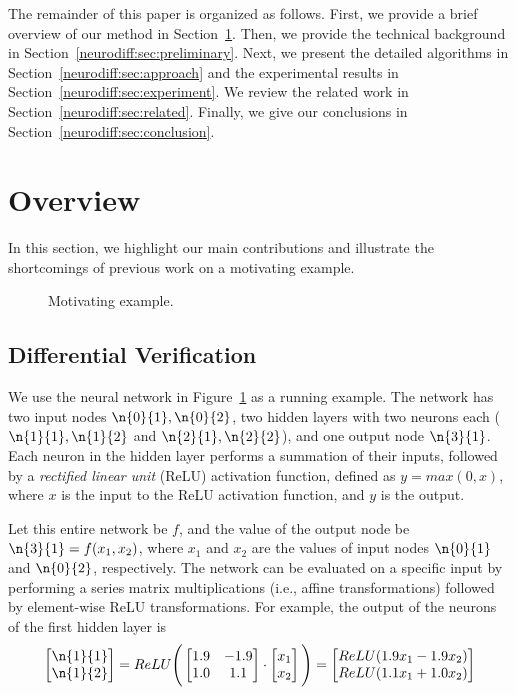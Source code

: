 The remainder of this paper is organized as follows.  First, we
provide a brief overview of our method in Section~\ref{neurodiff:sec:overview}.
Then, we provide the technical background in
Section~\ref{neurodiff:sec:preliminary}.  Next, we present the detailed
algorithms in Section~\ref{neurodiff:sec:approach} and the experimental results
in Section~\ref{neurodiff:sec:experiment}.  We review the related work in
Section~\ref{neurodiff:sec:related}. Finally, we give our conclusions in
Section~\ref{neurodiff:sec:conclusion}.



\section{Overview}
\label{neurodiff:sec:overview}

In this section, we highlight our main contributions and illustrate
the shortcomings of previous work on a motivating example.


\begin{figure}
	\centering
\scalebox{1.25}{}
\caption{Motivating example.}
\label{neurodiff:fig:motex}
\end{figure}



\subsection{Differential Verification}

We use the neural network in Figure~\ref{neurodiff:fig:motex} as a running
example. The network has two input nodes $ \n{0}{1}, \n{0}{2} $, two
hidden layers with two neurons each ($ \n{1}{1}, \n{1}{2} $ and
$ \n{2}{1}, \n{2}{2}$), and one output node $ \n{3}{1} $.  Each neuron
in the hidden layer performs a summation of their inputs, followed by
a \textit{rectified linear unit} (ReLU) activation function, defined
as $ y = max(0,x) $, where $ x $ is the input to the ReLU activation
function, and $ y $ is the output.

Let this entire network be $ f $, and the value of the output node be
$ \n{3}{1} = f(x_1, x_2) $, where $ x_1$ and $x_2 $ are the values of
input nodes $ \n{0}{1}$ and $\n{0}{2} $, respectively.
%
The network can be evaluated on a specific input by performing a
series matrix multiplications (i.e., affine transformations) followed
by element-wise ReLU transformations. For example, the output of
the neurons of the first hidden layer is
\[
\begin{bmatrix}
\n{1}{1} \\
\n{1}{2}
\end{bmatrix}
=
ReLU\Bigg(
\begin{bmatrix}
1.9 & -1.9 \\
1.0 & 1.1
\end{bmatrix}
\cdot
\begin{bmatrix}
x_1 \\
x_2
\end{bmatrix}
\Bigg)
=
\begin{bmatrix}
ReLU(1.9x_1 - 1.9x_2) \\
ReLU(1.1x_1 + 1.0x_2)
\end{bmatrix}
\]


